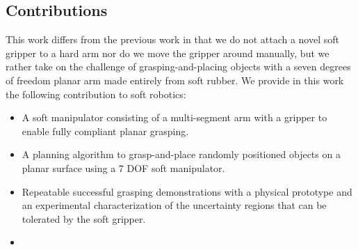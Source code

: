 \subsection{Contributions}
This work differs from the previous work in that we  do not attach a novel soft gripper to a hard arm nor do we move the gripper around manually, but we rather take on the challenge of grasping-and-placing objects with a seven degrees of freedom planar arm made entirely from soft rubber. 
We provide in this work the following contribution to soft robotics:
\begin{itemize}
  \item A soft manipulator consisting of a multi-segment arm with a gripper to enable fully compliant planar grasping.
  \item A planning algorithm to grasp-and-place randomly positioned objects on a planar surface using a 7 DOF soft manipulator.  
  \item Repeatable successful grasping demonstrations with a physical prototype and an experimental characterization of the uncertainty regions that can be tolerated by the soft gripper.
  \item {} 
\end{itemize}


